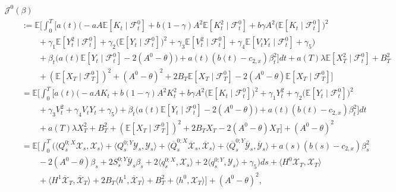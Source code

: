 \documentclass[10pt,a4paper]{amsart}
\numberwithin{equation}{section}
\newcommand{\E}{\mathbb{E}}
\newcommand{\ItF}{\mathcal{F}}
\renewcommand{\bar}{\overline}
\begin{document}
\begin{align}
    \label{eqn: mf target function regulator}
    &\mathcal{J}^0(\beta) \\
    &\nonumber\qquad :=\E \Bigg[ \int_0^T\Bigg[a(t) \Bigg(  -aA\E[K_t \mid \ItF^0_t] + b(1-\gamma)  A^2\E[ K^2_t \mid \ItF^0_t] + b \gamma A^2 \Big( \E[K_t\mid \ItF^0_t] \Big)^2  \\
    &\nonumber\qquad \qquad+ \gamma_1 \E[Y^2_t\mid\ItF^0_t] + \gamma_2 \Big(\E[Y_t \mid \ItF^0_t]\Big)^2 + \gamma_3 \E[ V^2_t\mid \ItF^0_t]  + \gamma_4 \E[V_t Y_t \mid \ItF^0_t] + \gamma_5\Bigg) \\
    &\nonumber\qquad\qquad  + \beta_t \big( a(t)\E[Y_t \mid \ItF^0_t] - 2(A^0-\theta)\big) +a(t)(b(t)-c_{2,x}) \beta^2_t \Bigg] dt + a(T) \lambda \E[X^2_T \mid \ItF^0_t] + B^2_T  \\
    &\nonumber\qquad\qquad + (\E[X_T\mid \ItF^0_T])^2+ (A^0 -\theta)^2 + 2 B_T \E[X_T \mid \ItF^0_T] - 2 (A^0 - \theta) \E[X_T \mid \ItF^0_T]\Bigg]\\
    &\nonumber\qquad =\E \Bigg[ \int_0^T\Bigg[a(t) \Bigg(  -aAK_t + b(1-\gamma) A^2 K^2_t + b  \gamma A^2\Big( \E[K_t\mid \ItF^0_t] \Big)^2 + \gamma_1Y^2_t+ \gamma_2 \Big(\E[Y_t \mid \ItF^0_t]\Big)^2 \\
    &\nonumber\qquad \qquad +\gamma_3 V^2_t + \gamma_4 V_t Y_t  + \gamma_5\Bigg) + \beta_t \big( a(t)\E[Y_t\mid \ItF^0_t]  - 2(A^0 - \theta)\big) +a(t)(b(t)-c_{2,x}) \beta^2_t \Bigg] dt \\
    &\nonumber \qquad\qquad+ a(T) \lambda X^2_T+B^2_T + (\E[X_T\mid \ItF^0_T])^2 + 2B_TX_T - 2(A^0-\theta)X_T\Bigg] + (A^0-\theta)^2\\
    &\nonumber\qquad = \E\Bigg[ \int_0^T (\langle Q^{0;X}_s \mathcal{X}_s,\mathcal{X}_s\rangle+\langle Q^{0;Y}_s \mathcal{Y}_s,\mathcal{Y}_s\rangle + \langle \bar{Q}^{0;X}_s \bar{\mathcal{X}}_s, \bar{\mathcal{X}}_s\rangle+ \langle \bar{Q}^{0;Y}_s \bar{\mathcal{Y}}_s, \bar{\mathcal{Y}}_s\rangle +a(s)(b(s)- c_{2,x})\beta_s^2\\
    &\nonumber\qquad \qquad  -2(A^0-\theta)\beta_s+ 2 S^{0;Y}_s \bar{\mathcal{Y}}_s \beta_s  + 2 \langle q^{0;X}_s , \mathcal{X}_s\rangle + 2 \langle q^{0;Y}_s ,\mathcal{Y}_s\rangle + \gamma_5) ds + \langle H^0 \mathcal{X}_T , \mathcal{X}_T\rangle\\
    &\nonumber\qquad\qquad + \langle H^1\bar{\mathcal{X}}_T, \bar{\mathcal{X}}_T\rangle + 2B_T \langle h^1, \bar{\mathcal{X}}_T \rangle+ B^2_T + \langle h^0, \mathcal{X}_T\rangle\Bigg]+ (A^0 - \theta)^2,
\end{align} 
\end{document}
